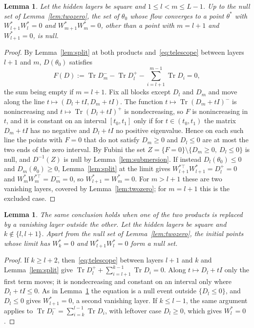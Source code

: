 \documentclass[11pt]{amsart}
\newtheorem{lemma}[theorem]{Lemma}
\theoremstyle{definition}
\theoremstyle{remark}
\numberwithin{equation}{section}
\DeclareMathOperator{\Tr}{Tr}
\begin{document}
\begin{lemma}\label{lem:twoprod}
Let the hidden layers be square and $1\le l<m\le L-1$. Up to the null set of Lemma~\ref{lem:twozero}, the set of $\theta_0$ whose flow converges to a point $\theta^*$ with $W^*_{l+1}W^*_l=0$ and $W^*_{m+1}W^*_m=0$, other than a point with $m=l+1$ and $W^*_{l+1}=0$, is null.
\end{lemma}
\begin{proof}
By Lemma~\ref{lem:split} at both products and~\eqref{eq:telescope} between layers $l+1$ and $m$, $D(\theta_0)$ satisfies
\[
F(D):=\Tr D_m^- -\Tr D_l^+-\sum_{i=l+1}^{m-1}\Tr D_i=0,
\]
the sum being empty if $m=l+1$. Fix all blocks except $D_l$ and $D_m$ and move along the line $t\mapsto(D_l+tI,D_m+tI)$. The function $t\mapsto\Tr(D_m+tI)^-$ is nonincreasing and $t\mapsto\Tr(D_l+tI)^+$ is nondecreasing, so $F$ is nonincreasing in $t$, and it is constant on an interval $[t_0,t_1]$ only if for $t\in(t_0,t_1)$ the matrix $D_m+tI$ has no negative and $D_l+tI$ no positive eigenvalue. Hence on each such line the points with $F=0$ that do not satisfy $D_m\ge0$ and $D_l\le0$ are at most the two ends of the zero interval. By Fubini the set $Z=\{F=0\}\setminus\{D_m\ge0,\ D_l\le0\}$ is null, and $D^{-1}(Z)$ is null by Lemma~\ref{lem:submersion}. If instead $D_l(\theta_0)\le0$ and $D_m(\theta_0)\ge0$, Lemma~\ref{lem:split} at the limit gives $W^{*\top}_{l+1}W^*_{l+1}=D_l^+=0$ and $W^*_mW^{*\top}_m=D_m^-=0$, so $W^*_{l+1}=W^*_m=0$. For $m>l+1$ these are two vanishing layers, covered by Lemma~\ref{lem:twozero}; for $m=l+1$ this is the excluded case.
\end{proof}

\begin{lemma}\label{lem:layerprod}
The same conclusion holds when one of the two products is replaced by a vanishing layer outside the other. Let the hidden layers be square and $k\notin\{l,l+1\}$. Apart from the null set of Lemma~\ref{lem:twozero}, the initial points whose limit has $W^*_k=0$ and $W^*_{l+1}W^*_l=0$ form a null set.
\end{lemma}
\begin{proof}
If $k\ge l+2$, then~\eqref{eq:telescope} between layers $l+1$ and $k$ and Lemma~\ref{lem:split} give $\Tr D_l^++\sum_{i=l+1}^{k-1}\Tr D_i=0$. Along $t\mapsto D_l+tI$ only the first term moves; it is nondecreasing and constant on an interval only where $D_l+tI\le0$. As in Lemma~\ref{lem:twoprod} the equation is a null event outside $\{D_l\le0\}$, and $D_l\le0$ gives $W^*_{l+1}=0$, a second vanishing layer. If $k\le l-1$, the same argument applies to $\Tr D_l^-=\sum_{i=k}^{l-1}\Tr D_i$, with leftover case $D_l\ge0$, which gives $W^*_l=0$.
\end{proof}
\end{document}
